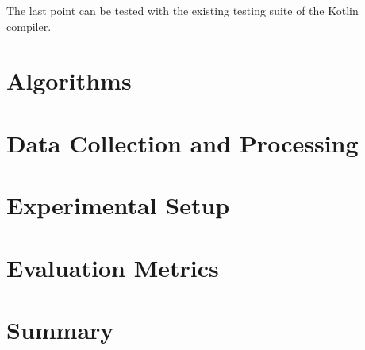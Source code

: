 The last point can be tested with the existing testing suite of the Kotlin compiler.

\section{Algorithms}
\label{sec:algorithms}

\section{Data Collection and Processing}
\label{sec:data}

\section{Experimental Setup}
\label{sec:experimental-setup}

\section{Evaluation Metrics}
\label{sec:metrics}

\section{Summary}
\label{sec:methodology-summary}
